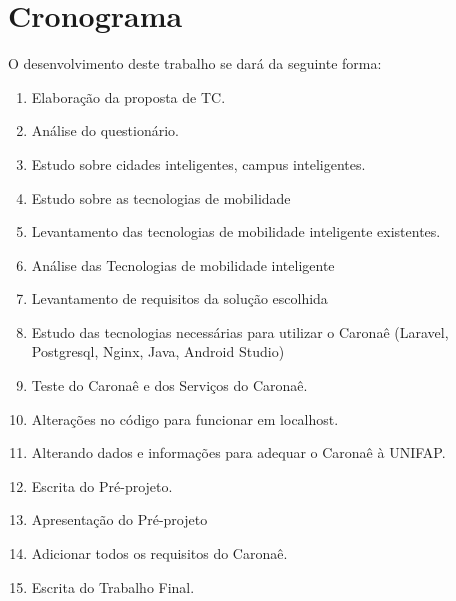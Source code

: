%
%

\chapter{Cronograma}\label{chap:Cronograma} 

O desenvolvimento deste trabalho se dará da seguinte forma:

\begin{enumerate}
 	\item \label{um} Elaboração da proposta de TC. %
	\item \label{dois} Análise do questionário. %
	\item \label{tres} Estudo sobre cidades inteligentes, campus inteligentes. %
	\item \label{quatro} Estudo sobre as tecnologias de mobilidade %
	\item \label{cinco} Levantamento das tecnologias de mobilidade inteligente existentes. %
	\item \label{seis}  Análise das Tecnologias de mobilidade inteligente %
	\item \label{sete} Levantamento de requisitos da solução escolhida %
	
	\item \label{oito} Estudo das tecnologias necessárias para utilizar o  Caronaê (Laravel, Postgresql, Nginx, Java, Android Studio) 
	\item \label{nove} Teste do Caronaê e dos Serviços do Caronaê. %
	\item \label{dez} Alterações no código para funcionar em localhost. %
	\item \label{onze} Alterando dados e informações para adequar o Caronaê à UNIFAP.
	\item \label{doze}  Escrita do Pré-projeto.
	\item \label{treze} Apresentação do Pré-projeto
	\item \label{catorze} Adicionar todos os requisitos do Caronaê.
	\item \label{quinze} Escrita do Trabalho Final.
\end{enumerate}


